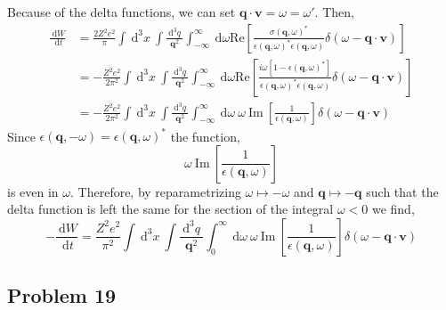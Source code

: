 \documentclass[12pt]{extarticle}
\renewcommand{\Im}[1]{\mathrm{Im} \: #1}
\renewcommand{\d}[1]{\: \mathrm{d}#1}
\newcommand{\dn}[2]{\: \mathrm{d}^{#1} #2 \:}
\newcommand{\deriv}[2]{\frac{\d{#1}}{\d{#2}}}
\renewcommand{\bf}[1]{\mathbf{#1}}
\renewcommand{\Re}[1]{\mathrm{Re}\left[ #1 \right]}
\theoremstyle{definition}
\begin{document}
Because of the delta functions, we can set $\bf{q} \cdot \bf{v} = \omega = \omega'$. Then,
\begin{align*}
\deriv{W}{t} & = \frac{2 Z^2 e^2}{\pi} \int \dn{3}{x} \int \frac{\dn{3}{q}}{\bf{q}^2} \int_{-\infty}^{\infty} \d{\omega} \Re{ \frac{\sigma(\bf{q}, \omega)^*}{\epsilon(\bf{q}, \omega)^* \epsilon(\bf{q}, \omega)} \delta(\omega - \bf{q} \cdot \bf{v}) }
\\
& = - \frac{Z^2 e^2}{2 \pi^2} \int \dn{3}{x} \int \frac{\dn{3}{q}}{\bf{q}^2} \int_{-\infty}^{\infty} \d{\omega} \Re{ \frac{i \omega[ 1 - \epsilon(\bf{q}, \omega)^*]}{\epsilon(\bf{q}, \omega)^* \epsilon(\bf{q}, \omega)} \delta(\omega - \bf{q} \cdot \bf{v}) }
\\
& = - \frac{Z^2 e^2}{2 \pi^2} \int \dn{3}{x} \int \frac{\dn{3}{q}}{\bf{q}^2} \int_{-\infty}^{\infty} \d{\omega} \: \omega \: \Im{\left[ \frac{1}{\epsilon(\bf{q}, \omega)} \right]} \delta(\omega - \bf{q} \cdot \bf{v})
\end{align*}
Since $\epsilon(\bf{q}, -\omega) = \epsilon(\bf{q}, \omega)^*$ the function,
\[ 
\omega \: \Im{\left[ \frac{1}{\epsilon(\bf{q}, \omega)} \right]} \]
is even in $\omega$. Therefore, by reparametrizing $\omega \mapsto - \omega$ and $\bf{q} \mapsto - \bf{q}$ such that the delta function is left the same for the section of the integral $\omega < 0$ we find,
\[ - \deriv{W}{t} = \frac{Z^2 e^2}{\pi^2} \int \dn{3}{x} \int \frac{\dn{3}{q}}{\bf{q}^2} \int_{0}^{\infty} \d{\omega} \: \omega \: \Im{\left[ \frac{1}{\epsilon(\bf{q}, \omega)} \right]} \delta(\omega - \bf{q} \cdot \bf{v}) \]

\subsection{Problem 19}
\end{document}
